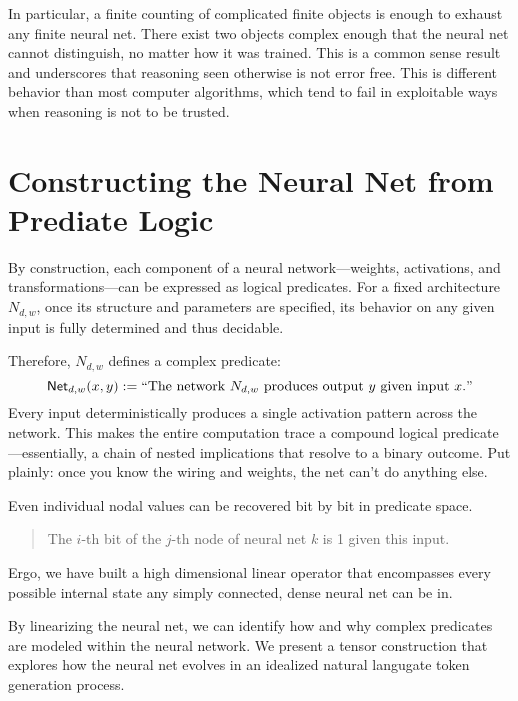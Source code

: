 \documentclass[12pt]{article}
\theoremstyle{plain}
\begin{document}
In particular, a finite counting of complicated finite objects is enough to exhaust
any finite neural net.  There exist two objects complex enough that the neural net
cannot distinguish, no matter how it was trained.  This is a common sense result
and underscores that reasoning seen otherwise is not error free.  This is
different behavior than most computer algorithms, which tend to fail in 
exploitable ways when reasoning is not to be trusted.

\section{Constructing the Neural Net from Prediate Logic}

By construction, each component of a neural network---weights, 
activations, and transformations---can be expressed as logical 
predicates. For a fixed architecture $N_{d,w}$, once its 
structure and parameters are specified, its behavior on any 
given input is fully determined and thus decidable.

Therefore, $N_{d,w}$ defines a complex predicate:
$$
    \mathsf{Net}_{d,w}(x, y) := \text{``The network } N_{d,w} \text{ produces output } y \text{ given input } x." 
$$
Every input deterministically produces a single activation 
pattern across the network. This makes the entire computation 
trace a compound logical predicate---essentially, a chain of 
nested implications that resolve to a binary outcome. Put 
plainly: once you know the wiring and weights, the net can’t 
do anything else.

Even individual nodal values can be recovered bit by bit in
predicate space.
\begin{quote}
    The $i$-th bit of the $j$-th node of neural net $k$ is 1 given this input.
\end{quote}

Ergo, we have built a high dimensional linear operator that encompasses
every possible internal state any simply connected, dense neural net can be in.

By linearizing the neural net, we can identify how and why
complex predicates are modeled within the neural network.  We present
a tensor construction that explores how the neural net evolves in
an idealized natural langugate token generation process.
\end{document}
